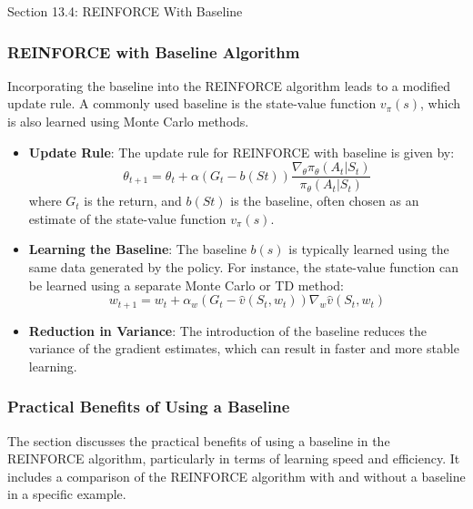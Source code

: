 \begin{notes}{Section 13.4: REINFORCE With Baseline}
    \subsubsection*{REINFORCE with Baseline Algorithm}
    
    Incorporating the baseline into the REINFORCE algorithm leads to a modified update rule. A commonly used baseline is the state-value function $v_\pi(s)$, which is also learned using Monte Carlo methods.
    
    \begin{highlight}
    
        \begin{itemize}
            \item \textbf{Update Rule}: The update rule for REINFORCE with baseline is given by:
            \[
            \theta_{t+1} = \theta_t + \alpha \left( G_t - b(St) \right) \frac{\nabla_\theta \pi_\theta(A_t|S_t)}{\pi_\theta(A_t|S_t)}
            \]
            where $G_t$ is the return, and $b(St)$ is the baseline, often chosen as an estimate of the state-value function $v_\pi(s)$.
            \item \textbf{Learning the Baseline}: The baseline $b(s)$ is typically learned using the same data generated by the policy. For instance, the state-value function can be learned using a 
            separate Monte Carlo or TD method:
            \[
            w_{t+1} = w_t + \alpha_w \left( G_t - \hat{v}(S_t, w_t) \right) \nabla_w \hat{v}(S_t, w_t)
            \]
            \item \textbf{Reduction in Variance}: The introduction of the baseline reduces the variance of the gradient estimates, which can result in faster and more stable learning.
        \end{itemize}
    
    \end{highlight}
    
    \subsubsection*{Practical Benefits of Using a Baseline}
    
    The section discusses the practical benefits of using a baseline in the REINFORCE algorithm, particularly in terms of learning speed and efficiency. It includes a comparison of the REINFORCE algorithm 
    with and without a baseline in a specific example.
    
    \begin{highlight}
    

\end{highlight}
\end{notes}
